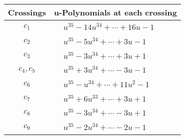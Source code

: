 \documentclass[1p]{elsarticle_modified}
\theoremstyle{definition}
\begin{document}
\begin{tabular}{m{50pt}|m{274pt}}
Crossings & \hspace{64pt}u-Polynomials at each crossing \\
\hline $$\begin{aligned}c_{1}\end{aligned}$$&$\begin{aligned}
&u^{35}-14 u^{34}+\cdots+16 u-1
\end{aligned}$\\
\hline $$\begin{aligned}c_{2}\end{aligned}$$&$\begin{aligned}
&u^{35}-5 u^{34}+\cdots+3 u-1
\end{aligned}$\\
\hline $$\begin{aligned}c_{3}\end{aligned}$$&$\begin{aligned}
&u^{35}-3 u^{34}+\cdots+3 u+1
\end{aligned}$\\
\hline $$\begin{aligned}c_{4},c_{5}\end{aligned}$$&$\begin{aligned}
&u^{35}+3 u^{34}+\cdots-3 u-1
\end{aligned}$\\
\hline $$\begin{aligned}c_{6}\end{aligned}$$&$\begin{aligned}
&u^{35}- u^{34}+\cdots+11 u^2-1
\end{aligned}$\\
\hline $$\begin{aligned}c_{7}\end{aligned}$$&$\begin{aligned}
&u^{35}+6 u^{33}+\cdots+3 u+1
\end{aligned}$\\
\hline $$\begin{aligned}c_{8}\end{aligned}$$&$\begin{aligned}
&u^{35}-3 u^{34}+\cdots-3 u+1
\end{aligned}$\\
\hline $$\begin{aligned}c_{9}\end{aligned}$$&$\begin{aligned}
&u^{35}-2 u^{34}+\cdots-2 u-1
\end{aligned}$\\

\end{tabular}
\end{document}
